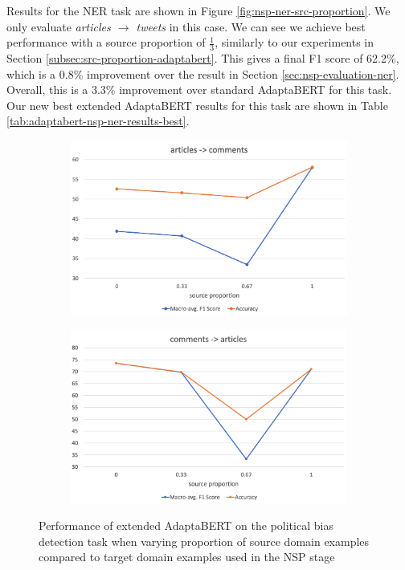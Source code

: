 Results for the NER task are shown in Figure \ref{fig:nsp-ner-src-proportion}. We only evaluate \textit{articles $ \rightarrow $ tweets} in this case. We can see we achieve best performance with a source proportion of $ \frac{1}{3} $, similarly to our experiments in Section \ref{subsec:src-proportion-adaptabert}. This gives a final F1 score of 62.2\%, which is a 0.8\% improvement over the result in Section \ref{sec:nsp-evaluation-ner}. Overall, this is a 3.3\% improvement over standard AdaptaBERT for this task. Our new best extended AdaptaBERT results for this task are shown in Table \ref{tab:adaptabert-nsp-ner-results-best}.

\begin{figure}[ht]
    \centering
    \begin{subfigure}{\textwidth}
        \centering
        \includegraphics[scale=0.24]{0-img/nsp-src-proportion-articles-comments.png}
    \end{subfigure}
    \begin{subfigure}{\textwidth}
        \centering
        \includegraphics[scale=0.24]{0-img/nsp-src-proportion-comments-articles.png}
    \end{subfigure}
    \caption{Performance of extended AdaptaBERT on the political bias detection task when varying proportion of source domain examples compared to target domain examples used in the NSP stage}
    \label{fig:nsp-src-proportion}
\end{figure}

